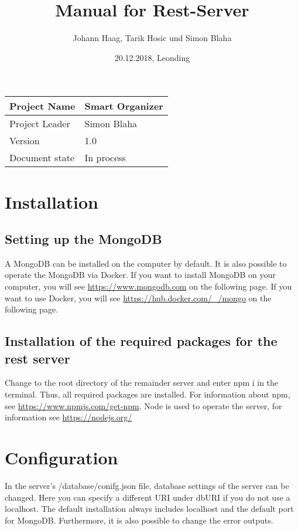 \documentclass[12pt]{scrartcl}
\title{Manual for Rest-Server}
\author{Johann Haag, Tarik Hosic und Simon Blaha}
\date{20.12.2018, Leonding}
\begin{document}
    \maketitle
    \begin{flushleft}
    \begin{tabular}{|l|l|}
    \hline
    Project Name & Smart Organizer \\ \hline
    Project Leader & Simon Blaha \\ \hline
    Version & 1.0\\ \hline
    Document state & In process \\ \hline
    \end{tabular}
    \end{flushleft}

    \pagebreak
    \tableofcontents
    \pagebreak

    \section{Installation}
    \subsection{Setting up the MongoDB}
        A MongoDB can be installed on the computer by default. It is also possible to operate the MongoDB via Docker.
        If you want to install MongoDB on your computer, you will see \url{https://www.mongodb.com} on the following page.
        If you want to use Docker, you will see \url{https://hub.docker.com/_/mongo} on the following page.
    \subsection{Installation of the required packages for the rest server}
        Change to the root directory of the remainder server and enter npm i in the terminal.
        Thus, all required packages are installed.
        For information about npm, see \url{https://www.npmjs.com/get-npm}.
        Node is used to operate the server, for information see \url{https://nodejs.org/}

    \section{Configuration}      
        In the server's /database/conifg.json file, database settings of the server can be changed.
        Here you can specify a different URI under dbURI if you do not use a localhost.
        The default installation always includes localhost and the default port for MongoDB.
        Furthermore, it is also possible to change the error outputs.
\end{document}
